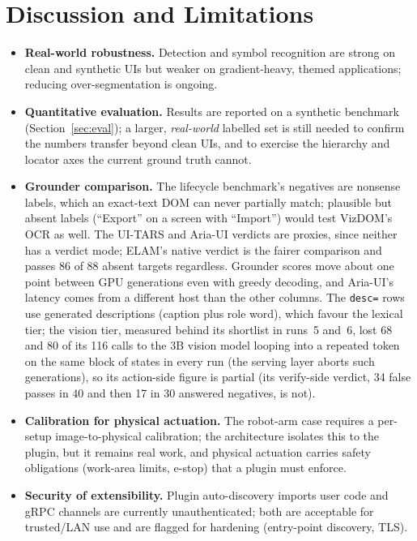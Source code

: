 \documentclass[11pt,a4paper]{article}
\newcommand{\code}[1]{\texttt{#1}}
\begin{document}
\section{Discussion and Limitations}
\begin{itemize}[leftmargin=1.4em]
  \item \textbf{Real-world robustness.} Detection and symbol recognition are strong
        on clean and synthetic UIs but weaker on gradient-heavy, themed
        applications; reducing over-segmentation is ongoing.
  \item \textbf{Quantitative evaluation.} Results are reported on a synthetic
        benchmark (Section~\ref{sec:eval}); a larger, \emph{real-world} labelled set
        is still needed to confirm the numbers transfer beyond clean UIs, and to
        exercise the hierarchy and locator axes the current ground truth cannot.
  \item \textbf{Grounder comparison.} The lifecycle benchmark's negatives are
        nonsense labels, which an exact-text DOM can never partially match; plausible
        but absent labels (``Export'' on a screen with ``Import'') would test VizDOM's
        OCR as well. The UI-TARS and Aria-UI verdicts are proxies, since neither has a
        verdict mode; ELAM's native verdict is the fairer comparison and passes 86 of
        88 absent targets regardless. Grounder scores move about one point between
        GPU generations even with greedy decoding, and Aria-UI's latency comes from a
        different host than the other columns. The \code{desc=} rows use generated
        descriptions (caption plus role word), which favour the lexical tier; the
        vision tier, measured behind its shortlist in runs~5 and~6, lost 68 and 80 of
        its 116 calls to the 3B vision model looping into a repeated token on the
        same block of states in every run (the serving layer aborts such
        generations), so its action-side figure is partial (its verify-side verdict,
        34 false passes in 40 and then 17 in 30 answered negatives, is not).
  \item \textbf{Calibration for physical actuation.} The robot-arm case requires a
        per-setup image-to-physical calibration; the architecture isolates this to
        the plugin, but it remains real work, and physical actuation carries safety
        obligations (work-area limits, e-stop) that a plugin must enforce.
  \item \textbf{Security of extensibility.} Plugin auto-discovery imports user code
        and gRPC channels are currently unauthenticated; both are acceptable for
        trusted/LAN use and are flagged for hardening (entry-point discovery, TLS).
\end{itemize}
\end{document}
